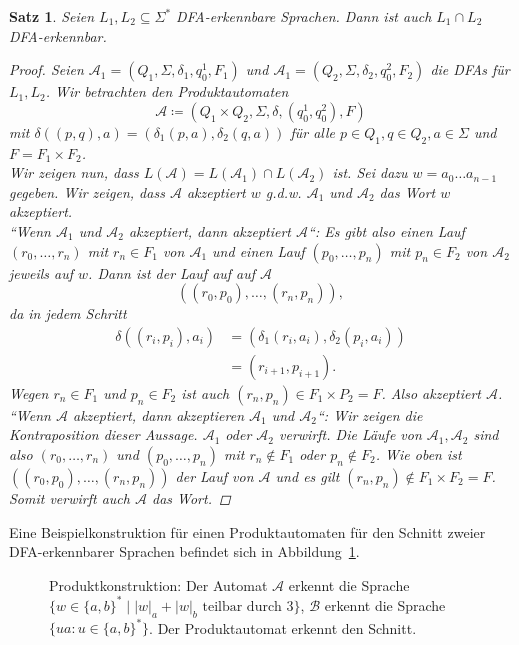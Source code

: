 \documentclass[11pt, a4paper]{article}
\theoremstyle{definition}
\theoremstyle{plain}
\newtheorem{theorem}[definition]{Satz}
\numberwithin{equation}{section}
\begin{document}
\begin{theorem}\label{thm:regular_intersection}
	Seien $L_1, L_2 \subseteq \Sigma^\ast$ DFA-erkennbare Sprachen. Dann ist auch $L_1 \cap L_2$ DFA-erkennbar.
	\begin{proof}
		Seien $\mathcal{A}_1 = (Q_1, \Sigma, \delta_1, q_0^1, F_1)$ und $\mathcal{A}_1 = (Q_2, \Sigma, \delta_2, q_0^2, F_2)$ die DFAs für $L_1, L_2$. Wir betrachten den \textit{Produktautomaten}
		$$
			\mathcal{A} \coloneqq (Q_1 \times Q_2, \Sigma, \delta, (q_0^1, q_0^2), F)
		$$
		mit $\delta((p, q), a) = (\delta_1(p, a), \delta_2(q, a))$ für alle $p \in Q_1, q \in Q_2, a \in \Sigma$ und $F = F_1 \times F_2$.\\
		Wir zeigen nun, dass $L(\mathcal{A}) = L(\mathcal{A}_1) \cap L(\mathcal{A}_2)$ ist.
		Sei dazu $w = a_0 \ldots a_{n-1}$ gegeben. Wir zeigen, dass $\mathcal{A}$ akzeptiert $w$ {g.d.w.} $\mathcal{A}_1$ und $\mathcal{A}_2$ das Wort $w$ akzeptiert.\\
		``Wenn $\mathcal{A}_1$ und $\mathcal{A}_2$ akzeptiert, dann akzeptiert $\mathcal{A}$``:
		Es gibt also einen Lauf $(r_0, \ldots, r_n)$ mit $r_n \in F_1$ von $\mathcal{A}_1$ und einen Lauf $(p_0, \ldots, p_n)$ mit $p_n \in F_2$ von $\mathcal{A}_2$ jeweils auf $w$. Dann ist der Lauf auf auf $\mathcal{A}$
		$$
			((r_0, p_0), \ldots, (r_n, p_n)),
		$$
		da in jedem Schritt 
		\begin{align*}
			\delta((r_i, p_i), a_i) &= (\delta_1(r_i, a_i), \delta_2(p_i, a_i)) \\
			&= (r_{i+1}, p_{i+1}).
		\end{align*}
		Wegen $r_n \in F_1$ und $p_n \in F_2$ ist auch $(r_n, p_n) \in F_1 \times P_2 = F$. Also akzeptiert $\mathcal{A}$.\\
		``Wenn $\mathcal{A}$ akzeptiert, dann akzeptieren $\mathcal{A}_1$ und $\mathcal{A}_2$``:
		Wir zeigen die Kontraposition dieser Aussage. $\mathcal{A}_1$ oder $\mathcal{A}_2$ verwirft. Die Läufe von $\mathcal{A}_1, \mathcal{A}_2$ sind also $(r_0, \ldots, r_n)$ und $(p_0, \ldots, p_n)$ mit $r_n \notin F_1$ oder $p_n \notin F_2$. Wie oben ist $((r_0, p_0), \ldots, (r_n, p_n))$ der Lauf von $\mathcal{A}$ und es gilt $(r_n, p_n) \notin F_1 \times F_2 = F$. Somit verwirft auch $\mathcal{A}$ das Wort.
	\end{proof}
\end{theorem}
Eine Beispielkonstruktion für einen Produktautomaten für den Schnitt zweier DFA-er\-kenn\-bar\-er Sprachen befindet sich in Abbildung~\ref{fig:dfa_product}.
\begin{figure}
	\centering
	
	\caption{Produktkonstruktion: Der Automat $\mathcal{A}$ erkennt die Sprache $\{ w \in \{a, b \}^\ast \mid |w|_a + |w|_b \text{ teilbar durch } 3 \}$, $\mathcal{B}$ erkennt die Sprache $\{ ua : u \in \{a, b\}^\ast \}$. Der Produktautomat erkennt den Schnitt.}
	\label{fig:dfa_product}
\end{figure}
\end{document}
